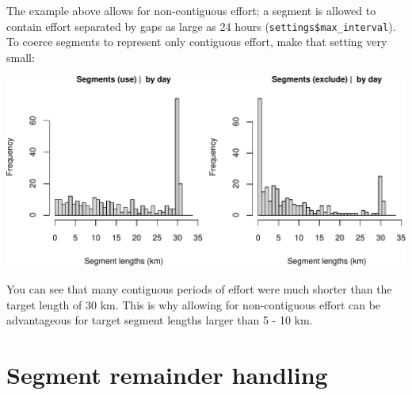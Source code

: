 \documentclass[
]{book}
\newenvironment{Shaded}{\begin{snugshade}}{\end{snugshade}}
\newcommand{\CommentTok}[1]{\textcolor[rgb]{0.56,0.35,0.01}{\textit{#1}}}
\newcommand{\DataTypeTok}[1]{\textcolor[rgb]{0.13,0.29,0.53}{#1}}
\newcommand{\DecValTok}[1]{\textcolor[rgb]{0.00,0.00,0.81}{#1}}
\newcommand{\FloatTok}[1]{\textcolor[rgb]{0.00,0.00,0.81}{#1}}
\newcommand{\KeywordTok}[1]{\textcolor[rgb]{0.13,0.29,0.53}{\textbf{#1}}}
\newcommand{\NormalTok}[1]{#1}
\newcommand{\OperatorTok}[1]{\textcolor[rgb]{0.81,0.36,0.00}{\textbf{#1}}}
\newcommand{\OtherTok}[1]{\textcolor[rgb]{0.56,0.35,0.01}{#1}}
\newcommand{\StringTok}[1]{\textcolor[rgb]{0.31,0.60,0.02}{#1}}
\begin{document}
The example above allows for non-contiguous effort; a segment is allowed to contain effort separated by gaps as large as 24 hours (\texttt{settings\$max\_interval}). To coerce segments to represent only contiguous effort, make that setting very small:

\begin{Shaded}
\end{Shaded}

\includegraphics{figures/unnamed-chunk-367-1.pdf}

You can see that many contiguous periods of effort were much shorter than the target length of 30 km. This is why allowing for non-contiguous effort can be advantageous for target segment lengths larger than 5 - 10 km.

\hypertarget{segment-remainder-handling}{%
\section*{Segment remainder handling}\label{segment-remainder-handling}}
\end{document}
